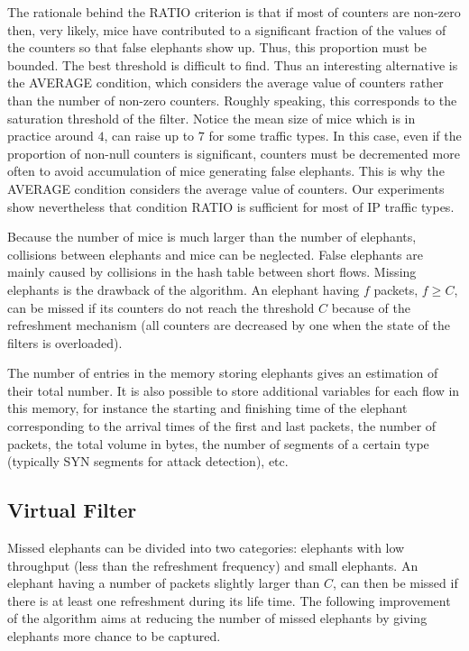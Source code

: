 \documentclass{amsart}
\begin{document}
The rationale behind the RATIO criterion is that if  most of counters are non-zero then, very likely, mice
have contributed  to a significant fraction  of the values  of the counters so  that false
elephants  show up. Thus, this proportion must be bounded. The best
threshold is difficult to  find. Thus an interesting alternative is
the AVERAGE  condition, which considers the average value  of counters rather than  the number of
non-zero counters. Roughly speaking, this corresponds to the saturation threshold
of the filter. 
Notice the mean size of mice which is in practice around $4$, can
raise up to $7$ for some traffic types. In this case, even if the proportion
of non-null counters is significant, counters must be decremented more
often to
avoid accumulation of mice generating false elephants.  This is why
the AVERAGE  condition considers the average value  of counters. Our experiments show  nevertheless that condition RATIO  is sufficient
for most of IP traffic types.

Because the number of mice is much larger than the number of elephants, collisions between
elephants and mice can be neglected.  False elephants are mainly caused by collisions in
the  hash  table  between  short  flows.    Missing  elephants  is  the  drawback  of  the
algorithm. An elephant  having $f$ packets, $f \geq  C$, can be missed if  its counters do
not  reach the  threshold  $C$ because  of  the refreshment  mechanism  (all counters  are
decreased by one when the state of the filters is overloaded).


The number of entries in the memory storing elephants gives an estimation of their total
number. It is also possible to store  additional variables for each flow in this memory,
for instance the starting and finishing time of the elephant corresponding to the arrival
times of the first and last packets, the number of packets, the total volume
in bytes, the number of segments of a certain type (typically SYN segments for attack
detection), etc.  

\subsection{Virtual Filter}

Missed elephants can  be divided into two categories: elephants  with low throughput (less
than  the  refreshment  frequency) and  small  elephants.  An  elephant having a number of
packets slightly larger than $C$,  can then be missed  if  there  is at least  one
refreshment  during  its  life time.  The  following improvement of the algorithm aims at
reducing  the number of missed elephants by giving  elephants more chance to be
captured.  
\end{document}
